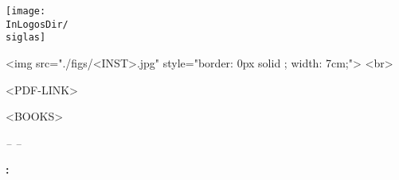 \pagestyle{empty}

\begin{center}
    \vspace{3cm}
    \begin{latexonly}
        \texttt{[image: \\InLogosDir/\\siglas]}\\
    \end{latexonly}
    \begin{htmlonly}
		\begin{rawhtml}
			<img src="./figs/<INST>.jpg" style="border: 0px solid ; width: 7cm;"> <br>
		\end{rawhtml}
	\end{htmlonly}
    
    \begin{huge}
        \underlogotext
    \end{huge}
    \latexhtml{\vspace{3cm}}{}

    \begin{huge}
        \doctitle
    \end{huge}
    \latexhtml{\vspace{3cm}}{}

	\begin{htmlonly}
		\begin{rawhtml}
        <PDF-LINK>

        <BOOKS>
		\end{rawhtml}
	\end{htmlonly}

    \begin{Large}
        \textit{-- \FinalReport --}
    \end{Large}
    \latexhtml{\vspace{4cm}}{}

    \begin{Large}
        \textbf{\LastModification: \fecha}
    \end{Large}
\end{center}
